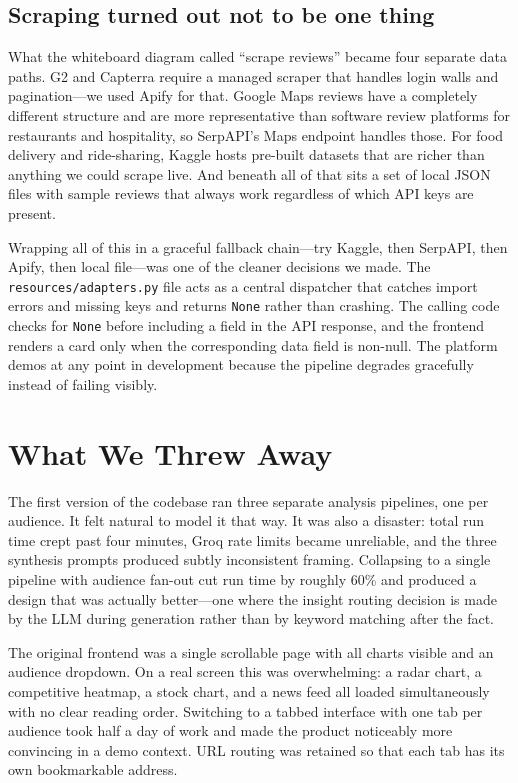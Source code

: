 \documentclass[9pt, a4paper, twocolumn]{article}
\begin{document}
\subsection{Scraping turned out not to be one thing}

What the whiteboard diagram called ``scrape reviews'' became four separate data paths. G2 and Capterra require a managed scraper that handles login walls and pagination---we used Apify for that. Google Maps reviews have a completely different structure and are more representative than software review platforms for restaurants and hospitality, so SerpAPI's Maps endpoint handles those. For food delivery and ride-sharing, Kaggle hosts pre-built datasets that are richer than anything we could scrape live. And beneath all of that sits a set of local JSON files with sample reviews that always work regardless of which API keys are present.

Wrapping all of this in a graceful fallback chain---try Kaggle, then SerpAPI, then Apify, then local file---was one of the cleaner decisions we made. The \texttt{resources/adapters.py} file acts as a central dispatcher that catches import errors and missing keys and returns \texttt{None} rather than crashing. The calling code checks for \texttt{None} before including a field in the API response, and the frontend renders a card only when the corresponding data field is non-null. The platform demos at any point in development because the pipeline degrades gracefully instead of failing visibly.

\section{What We Threw Away}

The first version of the codebase ran three separate analysis pipelines, one per audience. It felt natural to model it that way. It was also a disaster: total run time crept past four minutes, Groq rate limits became unreliable, and the three synthesis prompts produced subtly inconsistent framing. Collapsing to a single pipeline with audience fan-out cut run time by roughly 60\% and produced a design that was actually better---one where the insight routing decision is made by the LLM during generation rather than by keyword matching after the fact.

The original frontend was a single scrollable page with all charts visible and an audience dropdown. On a real screen this was overwhelming: a radar chart, a competitive heatmap, a stock chart, and a news feed all loaded simultaneously with no clear reading order. Switching to a tabbed interface with one tab per audience took half a day of work and made the product noticeably more convincing in a demo context. URL routing was retained so that each tab has its own bookmarkable address.
\end{document}
